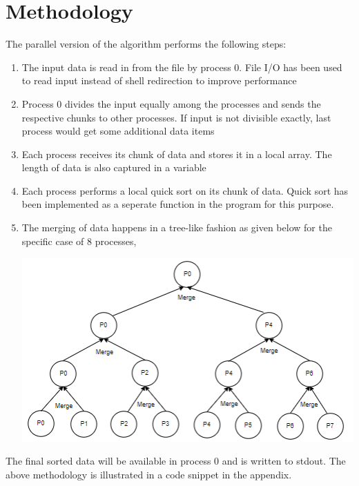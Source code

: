 \documentclass[11pt,a4paper,oneside]{article}
\begin{document}
	\section{Methodology}
	The parallel version of the algorithm performs the following steps:
	\begin{enumerate}
		\item The input data is read in from the file by process 0. File I/O has been used to read input instead of shell redirection to improve performance 
		\item Process 0 divides the input equally among the processes and sends the respective chunks to other processes. If input is not divisible exactly, last process would get some additional data items
		\item Each process receives its chunk of data and stores it in a local array. The length of data is also captured in a variable
		\item Each process performs a local quick sort on its chunk of data. Quick sort has been implemented as a seperate function in the program for this purpose.
		\item The merging of data happens in a tree-like fashion as given below for the specific case of 8 processes,
		
		\begin{center}
			\includegraphics[scale=1.0]{3.png}		
		\end{center}		
				
	\end{enumerate}
    The final sorted data will be available in process 0 and is written to stdout. The above methodology is illustrated in a code snippet in the appendix.
    
    \begin{verbatim}
       
    \end{verbatim}
	
\end{document}
